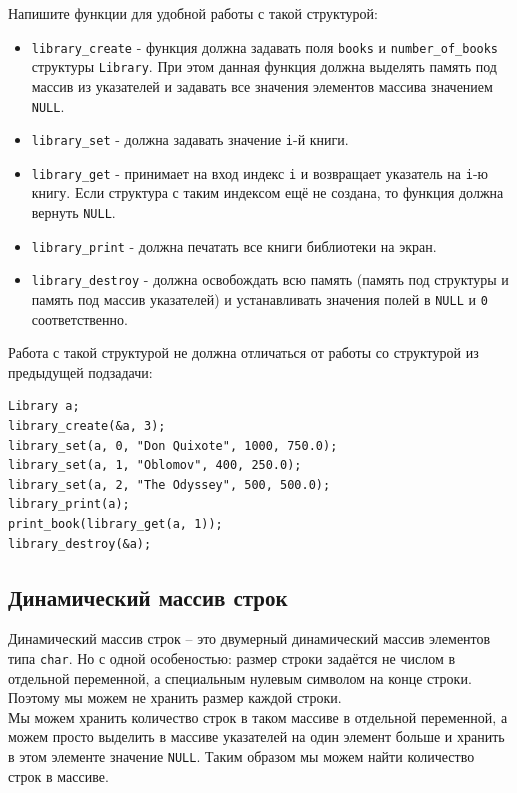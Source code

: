 \documentclass{article}
\begin{document}
\begin{enumerate}
Напишите функции для удобной работы с такой структурой:
\begin{itemize}
\item \texttt{library\_create} - функция должна задавать поля \texttt{books} и \texttt{number\_of\_books} структуры \texttt{Library}. При этом данная функция должна выделять память под массив из указателей и задавать все значения элементов массива значением \texttt{NULL}.
\item \texttt{library\_set} - должна задавать значение \texttt{i}-й книги.
\item \texttt{library\_get} - принимает на вход индекс \texttt{i} и возвращает указатель на \texttt{i}-ю книгу. Если структура с таким индексом ещё не создана, то функция должна вернуть \texttt{NULL}.
\item \texttt{library\_print} - должна печатать все книги библиотеки на экран.
\item \texttt{library\_destroy} - должна освобождать всю память (память под структуры и память под массив указателей) и устанавливать значения полей в \texttt{NULL} и \texttt{0} соответственно.
\end{itemize}

Работа с такой структурой не должна отличаться от работы со структурой из предыдущей подзадачи:
\begin{lstlisting}
Library a;
library_create(&a, 3);
library_set(a, 0, "Don Quixote", 1000, 750.0);
library_set(a, 1, "Oblomov", 400, 250.0);
library_set(a, 2, "The Odyssey", 500, 500.0);
library_print(a);
print_book(library_get(a, 1));
library_destroy(&a);
\end{lstlisting}
\fi
\end{enumerate}

\newpage
\subsection{Динамический массив строк}
Динамический массив строк -- это двумерный динамический массив элементов типа \texttt{char}. 
Но с одной особеностью: размер строки задаётся не числом в отдельной переменной, а специальным нулевым символом на конце строки. Поэтому мы можем не хранить размер каждой строки. \\
Мы можем хранить количество строк в таком массиве в отдельной переменной, а можем просто выделить в массиве указателей на один элемент больше и хранить в этом элементе значение \texttt{NULL}. Таким образом мы можем найти количество строк в массиве.\\
\end{document}
